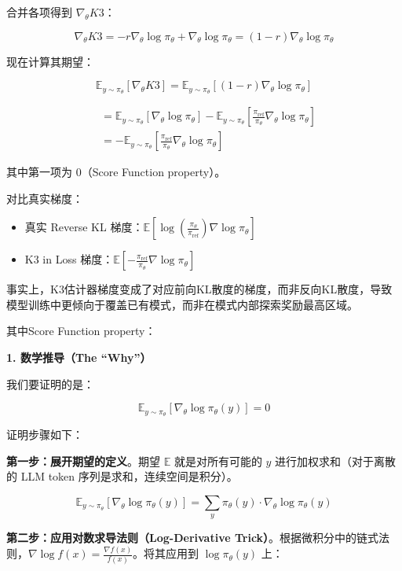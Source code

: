 合并各项得到 \(\nabla_\theta K3\)：

\[
\nabla_\theta K3
=-r\nabla_\theta\log\pi_\theta+\nabla_\theta\log\pi_\theta
=(1-r)\nabla_\theta\log\pi_\theta
\]

现在计算其期望：

\[
\mathbb{E}_{y\sim\pi_\theta}[\nabla_\theta K3]
=\mathbb{E}_{y\sim\pi_\theta}\left[(1-r)\nabla_\theta\log\pi_\theta\right]
\]

\[
\begin{aligned}
&=\mathbb{E}_{y\sim\pi_\theta}\left[\nabla_\theta\log\pi_\theta\right]
-\mathbb{E}_{y\sim\pi_\theta}\left[
\frac{\pi_{\mathrm{ref}}}{\pi_\theta}\nabla_\theta\log\pi_\theta
\right] \\
&=-\mathbb{E}_{y\sim\pi_\theta}\left[
\frac{\pi_{\mathrm{ref}}}{\pi_\theta}\nabla_\theta\log\pi_\theta
\right]
\end{aligned}
\]

其中第一项为 \(0\)（Score Function property）。

对比真实梯度：

\begin{itemize}
\tightlist
\item
  真实 Reverse KL 梯度：\(\mathbb{E}\left[\log\left(\frac{\pi_\theta}{\pi_{\mathrm{ref}}}\right)\nabla\log\pi_\theta\right]\)
\item
  K3 in Loss 梯度：\(\mathbb{E}\left[-\frac{\pi_{\mathrm{ref}}}{\pi_\theta}\nabla\log\pi_\theta\right]\)
\end{itemize}

事实上，K3估计器梯度变成了对应前向KL散度的梯度，而非反向KL散度，导致模型训练中更倾向于覆盖已有模式，而非在模式内部探索奖励最高区域。

其中Score Function property：

\textbf{1. 数学推导（The ``Why''）}

我们要证明的是：

\[
\mathbb{E}_{y\sim\pi_\theta}\left[\nabla_\theta\log\pi_\theta(y)\right]=0
\]

证明步骤如下：

\textbf{第一步：展开期望的定义}。期望 \(\mathbb{E}\) 就是对所有可能的 \(y\) 进行加权求和（对于离散的 LLM token 序列是求和，连续空间是积分）。

\[
\mathbb{E}_{y\sim\pi_\theta}\left[\nabla_\theta\log\pi_\theta(y)\right]
=\sum_y \pi_\theta(y)\cdot\nabla_\theta\log\pi_\theta(y)
\]

\textbf{第二步：应用对数求导法则（Log-Derivative Trick）}。根据微积分中的链式法则，\(\nabla\log f(x)=\frac{\nabla f(x)}{f(x)}\)。将其应用到 \(\log\pi_\theta(y)\) 上：

